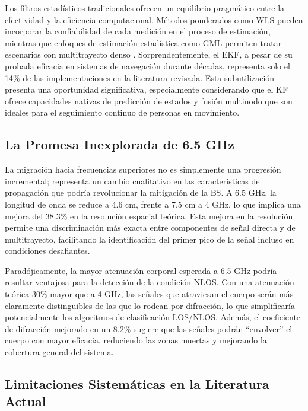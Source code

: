 Los filtros estadísticos tradicionales ofrecen un equilibrio pragmático entre la efectividad y la eficiencia computacional. Métodos ponderados como WLS pueden incorporar la confiabilidad de cada medición en el proceso de estimación, mientras que enfoques de estimación estadística como GML permiten tratar escenarios con multitrayecto denso \cite{ref11}. Sorprendentemente, el EKF, a pesar de su probada eficacia en sistemas de navegación durante décadas, representa solo el 14\% de las implementaciones en la literatura revisada. Esta subutilización presenta una oportunidad significativa, especialmente considerando que el KF ofrece capacidades nativas de predicción de estados y fusión multinodo que son ideales para el seguimiento continuo de personas en movimiento.

\subsection{La Promesa Inexplorada de 6.5 GHz}
\label{subsec:promesa_65ghz}

La migración hacia frecuencias superiores no es simplemente una progresión incremental; representa un cambio cualitativo en las características de propagación que podría revolucionar la mitigación de la BS. A 6.5 GHz, la longitud de onda se reduce a 4.6 cm, frente a 7.5 cm a 4 GHz, lo que implica una mejora del 38.3\% en la resolución espacial teórica. Esta mejora en la resolución permite una discriminación más exacta entre componentes de señal directa y de multitrayecto, facilitando la identificación del primer pico de la señal incluso en condiciones desafiantes.

Paradójicamente, la mayor atenuación corporal esperada a 6.5 GHz podría resultar ventajosa para la detección de la condición NLOS. Con una atenuación teórica 30\% mayor que a 4 GHz, las señales que atraviesan el cuerpo serán más claramente distinguibles de las que lo rodean por difracción, lo que simplificaría potencialmente los algoritmos de clasificación LOS/NLOS. Además, el coeficiente de difracción mejorado en un 8.2\% sugiere que las señales podrán ``envolver'' el cuerpo con mayor eficacia, reduciendo las zonas muertas y mejorando la cobertura general del sistema.

\subsection{Limitaciones Sistemáticas en la Literatura Actual}
\label{subsec:limitaciones_sistematicas}

